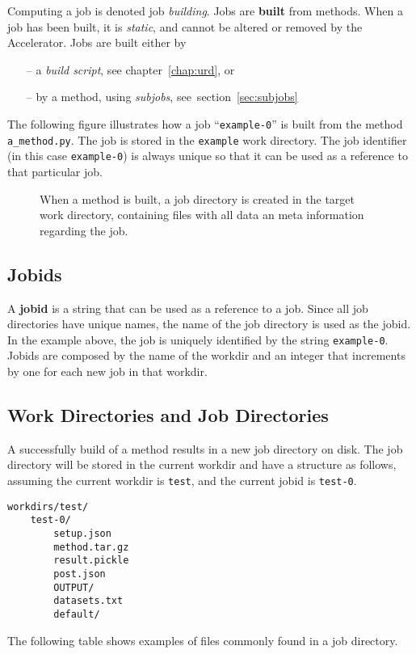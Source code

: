 Computing a job is denoted job \textsl{building}.
Jobs are \textbf{built} from methods.  When a job has been built, it
is \textsl{static}, and cannot be altered or removed by the
Accelerator.  Jobs are built either by
\begin{itemize}
\item[--] a \textsl{build script}, see chapter~\ref{chap:urd}, or
\item[--] by a method, using \textsl{subjobs}, see~section~\ref{sec:subjobs}
\end{itemize}
The following figure illustrates how a job ``\texttt{example-0}'' is
built from the method \texttt{a\_method.py}.  The job is stored in the
\texttt{example} work directory.  The job identifier (in this case
\texttt{example-0}) is always unique so that it can be used as a
reference to that particular job.
\begin{figure}[h!]
  \begin{center}
    \hspace{2cm}
    \label{fig:method}
  \end{center}
  \caption{When a method is built, a job directory is created in the
    target work directory, containing files with all data an meta
    information regarding the job.}
\end{figure}


\subsection{Jobids}
A \textbf{jobid} is a string that can be used as a reference to a job.
Since all job directories have unique names, the name of the job
directory is used as the jobid.  In the example above, the job is
uniquely identified by the string \texttt{example-0}.  Jobids are
composed by the name of the workdir and an integer that increments by
one for each new job in that workdir.


\subsection{Work Directories and Job Directories}
\label{sec:job_directories}
A successfully build of a method results in a new job directory on
disk.  The job directory will be stored in the current workdir and
have a structure as follows, assuming the current workdir is
\texttt{test}, and the current jobid is \texttt{test-0}.
\begin{verbatim}
workdirs/test/
    test-0/
        setup.json
        method.tar.gz
        result.pickle
        post.json
        OUTPUT/
        datasets.txt
        default/
\end{verbatim}
The following table shows examples of files commonly found in a job
directory.

